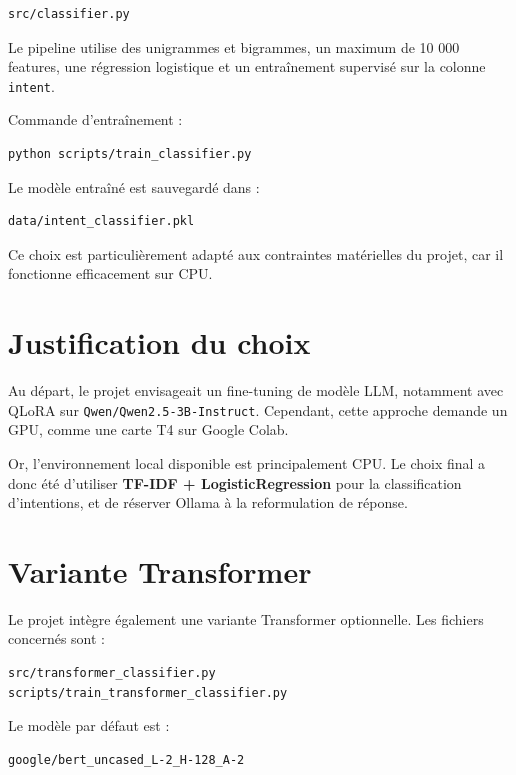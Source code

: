\documentclass[12pt,a4paper]{report}
\begin{document}
\begin{lstlisting}
src/classifier.py
\end{lstlisting}

Le pipeline utilise des unigrammes et bigrammes, un maximum de 10 000 features, une régression logistique et un entraînement supervisé sur la colonne \texttt{intent}.

Commande d'entraînement :

\begin{lstlisting}
python scripts/train_classifier.py
\end{lstlisting}

Le modèle entraîné est sauvegardé dans :

\begin{lstlisting}
data/intent_classifier.pkl
\end{lstlisting}

Ce choix est particulièrement adapté aux contraintes matérielles du projet, car il fonctionne efficacement sur CPU.

\section{Justification du choix}

Au départ, le projet envisageait un fine-tuning de modèle LLM, notamment avec QLoRA sur \texttt{Qwen/Qwen2.5-3B-Instruct}. Cependant, cette approche demande un GPU, comme une carte T4 sur Google Colab.

Or, l'environnement local disponible est principalement CPU. Le choix final a donc été d'utiliser \textbf{TF-IDF + LogisticRegression} pour la classification d'intentions, et de réserver Ollama à la reformulation de réponse.

\section{Variante Transformer}

Le projet intègre également une variante Transformer optionnelle. Les fichiers concernés sont :

\begin{lstlisting}
src/transformer_classifier.py
scripts/train_transformer_classifier.py
\end{lstlisting}

Le modèle par défaut est :

\begin{lstlisting}
google/bert_uncased_L-2_H-128_A-2
\end{lstlisting}
\end{document}
